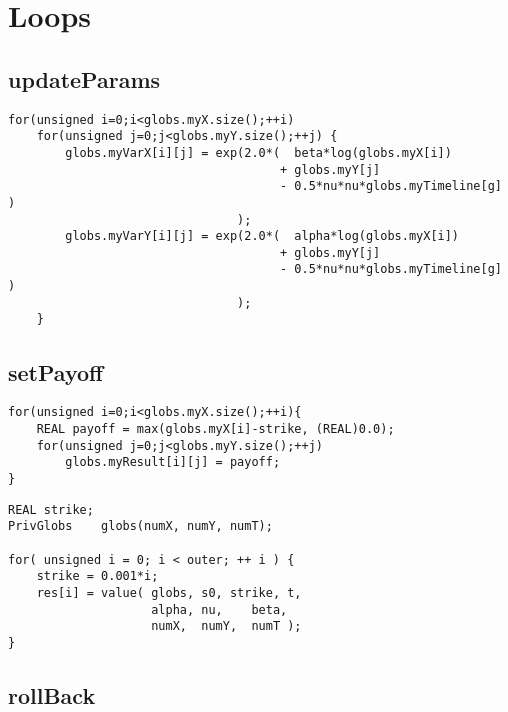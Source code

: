 \section{Loops}
\subsection{updateParams}
\begin{lstlisting}
for(unsigned i=0;i<globs.myX.size();++i)
    for(unsigned j=0;j<globs.myY.size();++j) {
        globs.myVarX[i][j] = exp(2.0*(  beta*log(globs.myX[i])   
                                      + globs.myY[j]             
                                      - 0.5*nu*nu*globs.myTimeline[g] )
                                );
        globs.myVarY[i][j] = exp(2.0*(  alpha*log(globs.myX[i])   
                                      + globs.myY[j]             
                                      - 0.5*nu*nu*globs.myTimeline[g] )
                                );
    }
\end{lstlisting} 
\subsection{setPayoff}
\begin{lstlisting}
for(unsigned i=0;i<globs.myX.size();++i){
    REAL payoff = max(globs.myX[i]-strike, (REAL)0.0);
    for(unsigned j=0;j<globs.myY.size();++j)
        globs.myResult[i][j] = payoff;
}
\end{lstlisting} 
\begin{lstlisting}
REAL strike;
PrivGlobs    globs(numX, numY, numT);

for( unsigned i = 0; i < outer; ++ i ) {
    strike = 0.001*i;
    res[i] = value( globs, s0, strike, t,
                    alpha, nu,    beta,
                    numX,  numY,  numT );
}
\end{lstlisting}
\subsection{rollBack}
\begin{lstlisting}
 
\end{lstlisting} 
